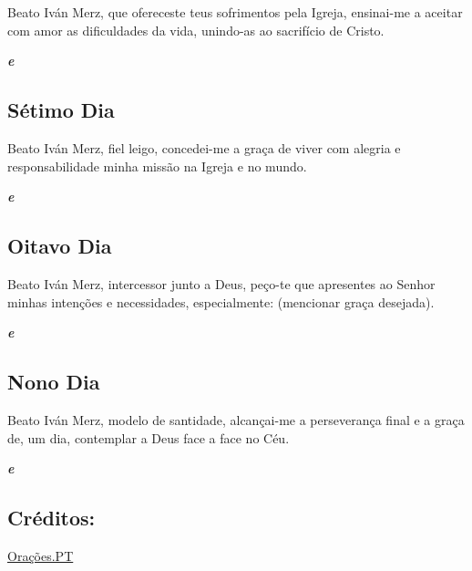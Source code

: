 \documentclass[18pt]{article}
\begin{document}
Beato Iván Merz, que ofereceste teus sofrimentos pela Igreja, ensinai-me a aceitar com amor as dificuldades da vida, unindo-as ao sacrifício de Cristo.

\textbf{\textit{ e }}

\subsection*{Sétimo Dia}
\textbf{\textit{}}

Beato Iván Merz, fiel leigo, concedei-me a graça de viver com alegria e responsabilidade minha missão na Igreja e no mundo.

\textbf{\textit{ e }}

\subsection*{Oitavo Dia}
\textbf{\textit{}}

Beato Iván Merz, intercessor junto a Deus, peço-te que apresentes ao Senhor minhas intenções e necessidades, especialmente: (mencionar graça desejada).

\textbf{\textit{ e }}

\subsection*{Nono Dia}
\textbf{\textit{}}

Beato Iván Merz, modelo de santidade, alcançai-me a perseverança final e a graça de, um dia, contemplar a Deus face a face no Céu.

\textbf{\textit{ e }}

\centering

\vfill

\subsection*{Créditos:}
\href{https://oracoes.pt/novena-ao-beato-ivan-merz/}{Orações.PT}
\end{document}
